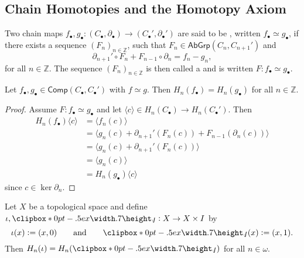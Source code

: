 \subsection*{Chain Homotopies and the Homotopy Axiom}
\begin{definition}
	Two chain maps $f_\bullet,g_\bullet : (C_\bullet,\partial_\bullet) \to (C_\bullet',\partial_\bullet')$ are said to be , written $f_\bullet \simeq g_\bullet$, if there exists a sequence $(F_n)_{n \in \mathbb{Z}}$, such that $F_n \in \mathsf{AbGrp}(C_n,C_{n + 1}')$ and 
	\begin{equation*}
		\partial_{n + 1}' \circ F_n + F_{n - 1} \circ \partial_n = f_n - g_n,
	\end{equation*}
	\noindent for all $n \in \mathbb{Z}$. The sequence $(F_n)_{n \in \mathbb{Z}}$ is then called a  and is written $F : f_\bullet \simeq g_\bullet$.
\end{definition}

\begin{proposition}
	\label{prop:inclusions}
	Let $f_\bullet,g_\bullet \in \mathsf{Comp}(C_\bullet,C_\bullet')$ with $f \simeq g$. Then $H_n(f_\bullet) = H_n(g_\bullet)$ for all $n \in \mathbb{Z}$.
\end{proposition}

\begin{proof}
	Assume $F : f_\bullet \simeq g_\bullet$ and let $\langle c \rangle \in H_n(C_\bullet) \to H_n(C_\bullet')$. Then
	\begin{align*}
		H_n(f_\bullet)\langle c \rangle &= \langle f_n(c) \rangle\\
		&= \langle g_n(c) + \partial_{n + 1}'(F_n(c)) + F_{n - 1}(\partial_n(c)) \rangle\\
		&= \langle g_n(c) + \partial_{n + 1}'(F_n(c)) \rangle\\
		&= \langle g_n(c) \rangle\\
		&= H_n(g_\bullet)\langle c \rangle
	\end{align*}
	\noindent since $c \in \ker \partial_n$.
\end{proof}

\begin{proposition}
	Let $X$ be a topological space and define $\iota,\jota : X \to X \times I$ by 
	\begin{equation*}
		\iota(x) := (x,0) \qquad \text{and} \qquad \jota(x) := (x,1).
	\end{equation*}
	Then $H_n(\iota) = H_n(\jota)$ for all $n \in \omega$.
\end{proposition}

